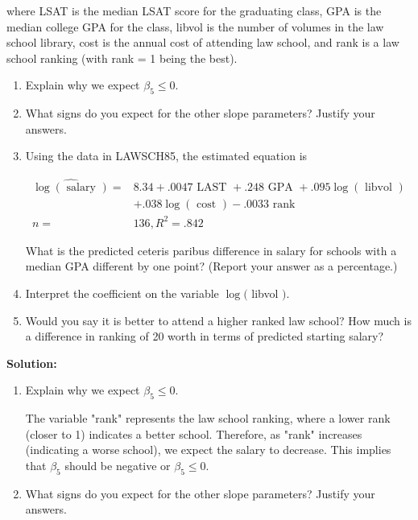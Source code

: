 \documentclass[12pt]{article}
\begin{document}
\begin{enumerate}
where LSAT is the median LSAT score for the graduating class, GPA is the median college GPA for the class, libvol is the number of volumes in the law school library, cost is the annual cost of attending law school, and rank is a law school ranking (with rank = 1 being the best).
\begin{enumerate}
    \item  Explain why we expect $\beta_5 \leq 0$.
\item  What signs do you expect for the other slope parameters? Justify your answers.
\item  Using the data in LAWSCH85, the estimated equation is

$$
\begin{aligned}
\widehat{\log (\text { salary })}= & 8.34+.0047 \text { LAST }+.248 \text { GPA }+.095 \log (\text { libvol }) \\
& +.038 \log (\text { cost })-.0033 \text { rank } \\
n= & 136, R^2=.842
\end{aligned}
$$


What is the predicted ceteris paribus difference in salary for schools with a median GPA different by one point? (Report your answer as a percentage.)
\item  Interpret the coefficient on the variable $\log ($ libvol $)$.
\item  Would you say it is better to attend a higher ranked law school? How much is a difference in ranking of 20 worth in terms of predicted starting salary?
\end{enumerate}

{\color{blue}
\noindent \textbf{Solution:}

\begin{enumerate}
    \item Explain why we expect \( \beta_5 \leq 0 \).

    The variable "rank" represents the law school ranking, where a lower rank (closer to 1) indicates a better school. Therefore, as "rank" increases (indicating a worse school), we expect the salary to decrease. This implies that \( \beta_5 \) should be negative or \( \beta_5 \leq 0 \).

    \item What signs do you expect for the other slope parameters? Justify your answers.


\end{enumerate}}
\end{enumerate}
\end{document}
